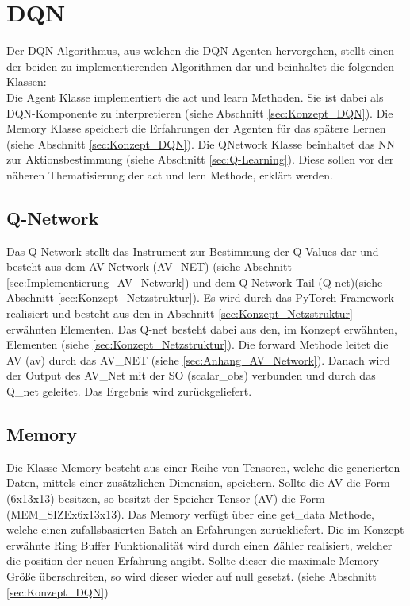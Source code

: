 \section{DQN}
Der DQN Algorithmus, aus welchen die DQN Agenten hervorgehen, stellt einen der beiden zu implementierenden Algorithmen dar und beinhaltet die folgenden Klassen:\\
Die Agent Klasse implementiert die act und learn Methoden. Sie ist dabei als DQN-Komponente zu interpretieren (siehe Abschnitt \ref{sec:Konzept_DQN}).
Die Memory Klasse speichert die Erfahrungen der Agenten für das spätere Lernen (siehe Abschnitt \ref{sec:Konzept_DQN}). Die QNetwork Klasse beinhaltet das NN zur Aktionsbestimmung (siehe Abschnitt \ref{sec:Q-Learning}). Diese sollen vor der näheren Thematisierung der act und lern Methode, erklärt werden.

\subsection{Q-Network} \label{sec:Implementierung_Q-Network}
Das Q-Network stellt das Instrument zur Bestimmung der Q-Values dar und besteht aus dem AV-Network (AV\_NET) (siehe Abschnitt \ref{sec:Implementierung_AV_Network}) und dem Q-Network-Tail (Q-net)(siehe Abschnitt \ref{sec:Konzept_Netzstruktur}).
Es wird durch das PyTorch Framework realisiert und besteht aus den in Abschnitt \ref{sec:Konzept_Netzstruktur} erwähnten Elementen.
Das Q-net besteht dabei aus den, im Konzept erwähnten, Elementen (siehe \ref{sec:Konzept_Netzstruktur}).
Die forward Methode leitet die AV (av) durch das AV\_NET (siehe \ref{sec:Anhang_AV_Network}). Danach wird der Output des AV\_Net mit der SO (scalar\_obs) verbunden und durch das Q\_net geleitet. Das Ergebnis wird zurückgeliefert.

\subsection{Memory} \label{sec:Implementierung_Memory}
Die Klasse Memory besteht aus einer Reihe von Tensoren, welche die generierten Daten, mittels einer zusätzlichen Dimension, speichern.
Sollte die AV die Form (6x13x13) besitzen, so besitzt der Speicher-Tensor (AV) die Form (MEM\_SIZEx6x13x13).
Das Memory verfügt über eine get\_data Methode, welche einen zufallsbasierten Batch an Erfahrungen zurückliefert. Die im Konzept erwähnte Ring Buffer Funktionalität wird durch einen Zähler realisiert, welcher die position der neuen Erfahrung angibt. Sollte dieser die maximale Memory Größe überschreiten, so wird dieser wieder auf null gesetzt. (siehe Abschnitt \ref{sec:Konzept_DQN})

